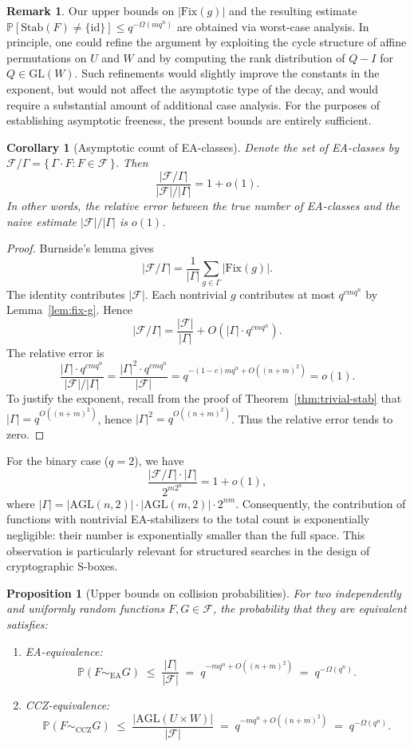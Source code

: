 \documentclass[11pt]{article}
\newtheorem{proposition}[theorem]{Proposition}
\newtheorem{corollary}[theorem]{Corollary}
\theoremstyle{definition}
\newtheorem{remark}[theorem]{Remark}
\newcommand{\Fcal}{\mathcal{F}}
\newcommand{\Gam}{\Gamma}
\newcommand{\GL}{\mathrm{GL}}
\newcommand{\AGL}{\mathrm{AGL}}
\newcommand{\id}{\mathrm{id}}
\newcommand{\Stab}{\mathrm{Stab}}
\newcommand{\Fix}{\mathrm{Fix}}
\renewcommand{\Pr}{\mathbb{P}}
\begin{document}
\begin{remark}
Our upper bounds on $|\Fix(g)|$ and the resulting estimate
$\Pr[\Stab(F)\ne\{\id\}]\le q^{-\Omega(m q^n)}$
are obtained via worst-case analysis.
In principle, one could refine the argument by exploiting the
cycle structure of affine permutations on $U$ and $W$ and by computing
the rank distribution of $Q-I$ for $Q\in\GL(W)$.
Such refinements would slightly improve the constants in the exponent,
but would not affect the asymptotic type of the decay, and would require
a substantial amount of additional case analysis.
For the purposes of establishing asymptotic freeness, the present bounds
are entirely sufficient.
\end{remark}

\begin{corollary}[Asymptotic count of EA-classes]\label{cor:orbit-count}
Denote the set of EA-classes by $\Fcal/\Gam = \{\, \Gam\cdot F : F\in\Fcal \,\}$.
Then
\[
   \frac{|\Fcal/\Gam|}{|\Fcal|/|\Gam|}
   = 1 + o(1).
\]
In other words, the relative error between the true number of EA-classes
and the naive estimate $|\Fcal|/|\Gam|$ is $o(1)$.
\end{corollary}

\begin{proof}
Burnside's lemma gives
\[
   |\Fcal/\Gam|
   = \frac{1}{|\Gam|}\sum_{g\in \Gam}|\Fix(g)|.
\]
The identity contributes $|\Fcal|$.
Each nontrivial $g$ contributes at most $q^{c mq^n}$ by Lemma~\ref{lem:fix-g}.
Hence
\[
   |\Fcal/\Gam|
   = \frac{|\Fcal|}{|\Gam|}
     + O\!\left( |\Gam|\cdot q^{c mq^n}\right).
\]
The relative error is
\[
   \frac{|\Gam|\cdot q^{c mq^n}}{|\Fcal|/|\Gam|}
   = \frac{|\Gam|^2\cdot q^{c mq^n}}{|\Fcal|}
   = q^{-(1-c)mq^n + O((n+m)^2)}
   = o(1).
\]
To justify the exponent, recall from the proof of Theorem~\ref{thm:trivial-stab}
that $|\Gam| = q^{O((n+m)^2)}$, hence $|\Gam|^2 = q^{O((n+m)^2)}$.
Thus the relative error tends to zero.
\end{proof}

For the binary case ($q=2$), we have
\[
   \frac{|\Fcal/\Gam|\cdot |\Gam|}{2^{m2^n}}
   = 1 + o(1),
\]
where $|\Gam|=|\AGL(n,2)|\cdot|\AGL(m,2)|\cdot 2^{nm}$.
Consequently, the contribution of functions
with nontrivial EA-stabilizers to the total count is exponentially negligible:
their number is exponentially smaller than the full space.
This observation is particularly relevant for structured searches in the design
of cryptographic S-boxes.

\begin{proposition}[Upper bounds on collision probabilities]\label{cor:collision-upper}
For two independently and uniformly random functions $F,G\in\Fcal$, the probability
that they are equivalent satisfies:
\begin{enumerate}
\item \emph{EA-equivalence:}
\[
\Pr(F\sim_{\mathrm{EA}} G)
\;\le\;
\frac{|\Gam|}{|\Fcal|}
\;=\;
q^{-mq^n + O((n+m)^2)}
\;=\;
q^{-\Omega(q^n)}.
\]
\item \emph{CCZ-equivalence:}
\[
\Pr(F\sim_{\mathrm{CCZ}} G)
\;\le\;
\frac{|\AGL(U \times W)|}{|\Fcal|}
\;=\;
q^{-mq^n + O((n+m)^2)}
\;=\;
q^{-\Omega(q^n)}.
\]
\end{enumerate}
\end{proposition}
\end{document}
